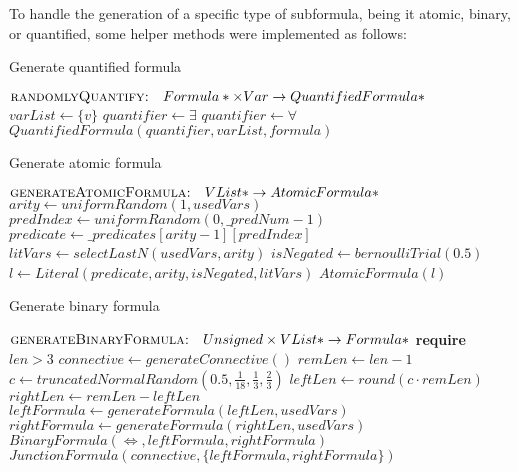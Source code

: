 To handle the generation of a specific type of subformula, being it atomic, binary, or quantified, some helper methods were implemented as follows:

\begin{algorithm}[H]
  \caption{Generate quantified formula}\label{alg:generate-quantified-formula}
  \begin{algorithmic}[1]
      \Statex{}  \(\textsc{randomlyQuantify:} \quad Formula* \times Var \to QuantifiedFormula*\)
        \State{} \(varList \gets \{v\}\)
          \State{} \(quantifier \gets \exists\)
        \Else{}
          \State{} \(quantifier \gets \forall\)
        \EndIf{}
        \State{} \Return{} \(QuantifiedFormula(quantifier,varList, formula)\)
      \EndFunction{}
  \end{algorithmic}

\end{algorithm}
\begin{algorithm}[H]
  \caption{Generate atomic formula}\label{alg:generate-atomic-formula}
  \begin{algorithmic}[1]
      \Statex{}  \(\textsc{generateAtomicFormula:} \quad VList* \to AtomicFormula*\)
        \State{} \(arity \gets uniformRandom(1,usedVars)\)
        \State{} \(predIndex \gets uniformRandom(0, \_predNum - 1)\)
        \State{} \(predicate \gets \_predicates[arity-1] [predIndex]\)
        \State{} \(litVars \gets selectLastN(usedVars, arity)\)
        \State{} \(isNegated \gets bernoulliTrial(0.5)\)
        \State{} \(l \gets Literal(predicate, arity, isNegated,litVars)\)
        \State{} \Return{} \(AtomicFormula(l)\)
      \EndFunction{}
  \end{algorithmic}
\end{algorithm}
\begin{algorithm}[H]
  \caption{Generate binary formula}\label{alg:generate-binary-formula}
  \begin{algorithmic}[1]
      \Statex{}  \(\textsc{generateBinaryFormula:} \quad Unsigned \times VList* \to Formula*\)
      \Statex{} \textbf{require} \(len > 3\)
        \State{} \(connective \gets generateConnective()\)
        \State{} \(remLen \gets len - 1\)
        \State{} \(c \gets truncatedNormalRandom(0.5, \frac{1}{18}, \frac{1}{3}, \frac{2}{3})\)
        \State{} \(leftLen \gets round(c \cdot remLen)\)
        \State{} \(rightLen \gets remLen - leftLen\)
        \State{} \(leftFormula \gets generateFormula(leftLen, usedVars)\)
        \State{} \(rightFormula \gets generateFormula(rightLen, usedVars)\)
          \State{} \Return{} \(BinaryFormula(\iff,leftFormula, rightFormula)\)
        \Else{}
          \State{} \Return{} \(JunctionFormula(connective,\{leftFormula, rightFormula\})\)
        \EndIf{}
      \EndFunction{}
  \end{algorithmic}
\end{algorithm}

